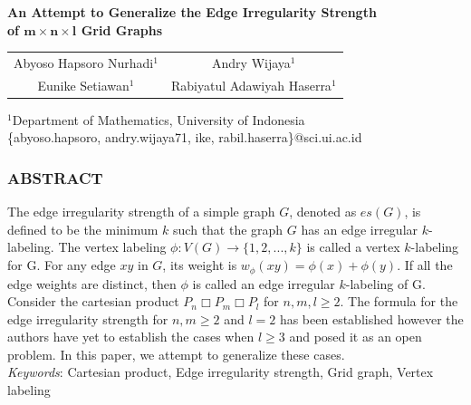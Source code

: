 \documentclass[12pt, a4paper]{report}
\newlength\tindent
\renewcommand{\indent}{\hspace*{\tindent}}
\theoremstyle{definition}
\theoremstyle{definition}
\theoremstyle{remark}
\theoremstyle{definition}
\theoremstyle{definition}
\begin{document}
\setlength{\abovedisplayskip}{0pt}
\setlength{\belowdisplayskip}{0pt}
\setlength{\abovedisplayshortskip}{0pt}
\setlength{\belowdisplayshortskip}{0pt}

{\centering
	\fontsize{14pt}{12pt}
	\textbf{An Attempt to Generalize the Edge Irregularity Strength}\\
	\textbf{of $\bm{m\times n\times l}$ Grid Graphs}
	
	\vspace{9pt}
	
	\begin{tabular}{cc}
		Abyoso Hapsoro Nurhadi$^1$ & Andry Wijaya$^1$\\
		Eunike Setiawan$^1$ & Rabiyatul Adawiyah Haserra$^1$\\
	\end{tabular}
	
	\vspace{8pt}
	
	$^1$Department of Mathematics, University of Indonesia\\
	\{abyoso.hapsoro, andry.wijaya71, ike, rabil.haserra\}@sci.ui.ac.id
\par}

\vspace{5pt}
\makebox[\linewidth]{\rule{\textwidth}{0.1pt}}

\subsubsection*{ABSTRACT}
\indent The edge irregularity strength of a simple graph $G$, denoted as $es(G)$, is defined to be the minimum $k$ such that the graph $G$ has an edge irregular $k$-labeling. The vertex labeling $\phi:V(G)\to\{1,2,...,k\}$ is called a vertex $k$-labeling for G. For any edge $xy$ in $G$, its weight is $w_\phi (xy) = \phi(x) + \phi(y)$. If all the edge weights are distinct, then $\phi$ is called an edge irregular $k$-labeling of G.\\
\indent Consider the cartesian product $P_n\Box P_m\Box P_l$ for $n,m,l\geq2$. The formula for the edge irregularity strength for $n,m\geq2$ and $l=2$ has been established however the authors have yet to establish the cases when $l\geq3$ and posed it as an open problem. In this paper, we attempt to generalize these cases.\\
\textit{Keywords}: Cartesian product, Edge irregularity strength, Grid graph, Vertex labeling

\makebox[\linewidth]{\rule{\textwidth}{0.1pt}}
\end{document}
